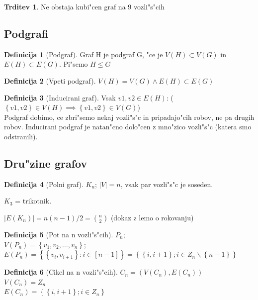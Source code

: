 \documentclass{article}
\theoremstyle{definition}
\newtheorem{definition}{Definicija}[section]
\newtheorem{claim}{Trditev}[section]
\begin{document}
	\begin{claim} 
		Ne obstaja kubi"cen graf na 9 vozli"s"cih
	\end{claim}
	
	
	\subsection{Podgrafi}
	\begin{definition}[Podgraf]
		Graf H je podgraf G, "ce je $V(H) \subset V(G)$ in $E(H) \subset E(G)$. Pi"semo $H \leq G$
	\end{definition}
	\begin{definition}[Vpeti podgraf]
		$V(H) = V(G) \land E(H) \subset E(G)$
	\end{definition}
	\begin{definition}[Inducirani graf]
		Vsak $v1,v2 \in E(H)$: ($\left\lbrace v1,v2\right\rbrace \in V(H) \implies \left\lbrace v1,v2\right\rbrace \in V(G)$)
		\\
		Podgraf dobimo, ce zbri"semo nekaj vozli"s"c in pripadajo"cih robov, ne pa drugih robov.
		Inducirani podgraf je natan"cno dolo"cen z mno"zico vozli"s"c (katera smo odstranili).
	\end{definition}
	
	\subsection{Dru"zine grafov} 
	\begin{definition}[Polni graf]
		$K_n$; $|V| = n$, vsak par vozli"s"c je soseden.
	\end{definition}

	$K_3$ = trikotnik.
	
	$|E(K_n)| = n(n-1)/2 = {n \choose 2}$ (dokaz z lemo o rokovanju)
	
	\begin{definition}[Pot na n vozli"s"cih]
		$P_n$;
		\\
		$V(P_n) = \left\lbrace v_1, v_2, \ldots ,v_n \right\rbrace$; 
		\\
		$E(P_n) = \left\lbrace\left\lbrace v_i, v_{i+1} \right\rbrace : i \in [n-1]\right\rbrace = \left\lbrace \left\lbrace i, i+1 \right\rbrace; i \in Z_n \backslash \left\lbrace n-1\right\rbrace\right\rbrace$ \\ 
	\end{definition}
	\begin{definition}[Cikel na n vozli"s"cih]
		$C_n = (V(C_n), E(C_n))$ \\
		$V(C_n) = Z_n$ \\
		$E(C_n) = \left\lbrace\left\lbrace i,i+1\right\rbrace; i \in Z_n\right\rbrace$
	\end{definition}
\end{document}
